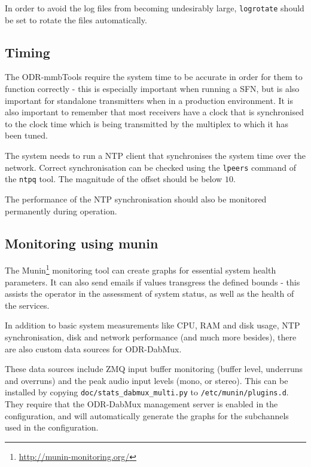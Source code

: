 
In order to avoid the log files from becoming undesirably large, \texttt{logrotate}
should be set to rotate the files automatically.



\subsection{Timing}
The ODR-mmbTools require the system time to be accurate in order for them to
function correctly - this is especially important when running a SFN, but is
also important for standalone transmitters when in a production environment. It
is also important to remember that most receivers have a clock that is
synchronised to the clock time which is being transmitted by the multiplex to
which it has been tuned.

The system needs to run a NTP client that synchronises the system time over the
network. Correct synchronisation can be checked using the \texttt{lpeers}
command of the \texttt{ntpq} tool. The magnitude of the offset should be below
$10$\ms.

The performance of the NTP synchronisation should also be monitored permanently
during operation.


\subsection{Monitoring using munin}

The Munin\footnote{\url{http://munin-monitoring.org/}} monitoring tool can
create graphs for essential system health parameters. It can also send emails
if values transgress the defined bounds - this assists the operator in the
assessment of system status, as well as the health of the services.

In addition to basic system measurements like CPU, RAM and disk usage, NTP
synchronisation, disk and network performance (and much more besides), there
are also custom data sources for ODR-DabMux.

These data sources include ZMQ input buffer monitoring (buffer level, underruns
and overruns) and the peak audio input levels (mono, or stereo). This
can be installed by copying \verb+doc/stats_dabmux_multi.py+ to
\texttt{/etc/munin/plugins.d}. They require that the ODR-DabMux management
server is enabled in the configuration, and will automatically generate the
graphs for the subchannels used in the configuration.


